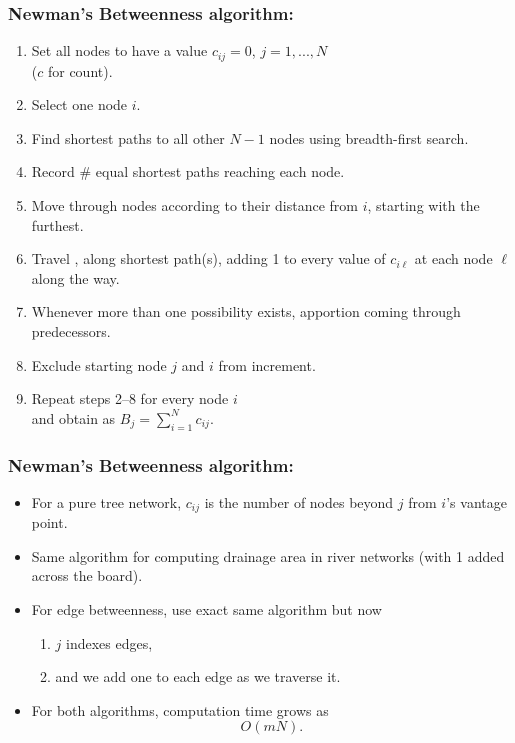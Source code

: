 \begin{frame}
  \frametitle{Newman's Betweenness algorithm:\cite{newman2001d}}
  
  \begin{enumerate}
  \item<1->
    Set all nodes to have a value $c_{ij}=0$, $j=1,...,N$\\
    ($c$ for count).
  \item<2->
    Select one node $i$.
  \item<3->
    Find \alert{shortest paths} to all other $N-1$ nodes using
    breadth-first search.
  \item<4->
    Record \# equal shortest paths reaching each node.
  \item<5->
    Move through nodes according to their distance from
    $i$, starting with the furthest.
  \item<6->
    Travel , 
    along shortest path(s), adding
    1 to every value of $c_{i \ell}$ at each node $\ell$ along the way.
  \item<7->
    Whenever more than one possibility exists,
    apportion 
    coming through predecessors.
  \item<8->
    Exclude starting node $j$ and $i$ from increment.
  \item<9->
    Repeat steps 2--8 for every node $i$\\ 
    and obtain
     as 
    \alert{$ B_j = \sum_{i=1}^N c_{ij}. $}
  \end{enumerate}

\end{frame}

\begin{frame}
  \frametitle{Newman's Betweenness algorithm:\cite{newman2001d}}

  \begin{itemize}
  \item<1-> 
    For a \alert{pure tree network}, $c_{ij}$ is the
    number of nodes beyond $j$ from $i$'s vantage point.
  \item<2-> 
    Same algorithm for computing drainage area in
    river networks (with 1 added across the board).
  \item<3-> 
    For \alert{edge betweenness}, use exact same
    algorithm but now 
    \begin{enumerate}
    \item<4-> 
      $j$ indexes edges,
    \item<5-> 
      and we add one to each edge as we traverse it.
    \end{enumerate}
  \item<6-> 
    For both algorithms, computation
    time grows as 
    $$O (mN). $$
  \end{itemize}
  
\end{frame}

